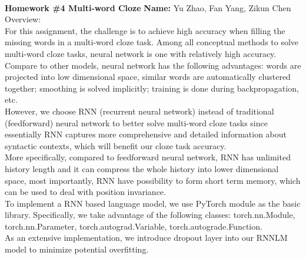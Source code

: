 \documentclass[11pt]{article}
\begin{document}
\\
{{\bf Homework \#4 Multi-word Cloze}} \hfill {{\bf Name:} Yu Zhao, Fan Yang, Zikun Chen} \\

\noindent \Large Overview:\\

\normalsize For this assignment, the challenge is to achieve high accuracy when filling the missing words in a multi-word cloze task. 
Among all conceptual methods to solve multi-word cloze tasks, neural network is one with relatively high accuracy. Compare to other models, neural network has the following advantages: words are projected into low dimensional space, similar words are automatically clustered together; smoothing is solved implicitly; training is done during backpropagation, etc.\\
\indent However, we choose RNN (recurrent neural network) instead of traditional (feedforward) neural network to better solve multi-word cloze tasks since essentially RNN captures more comprehensive and detailed information about syntactic contexts, which will benefit our cloze task accuracy. \\
\indent More specifically, compared to feedforward neural network, RNN has unlimited history length and it can compress the whole history into lower dimensional space, most importantly, RNN have possibility to form short term memory, which can be used to deal with position invariance.\\
\indent To implement a RNN based language model, we use PyTorch module as the basic library. Specifically, we take advantage of the following classes: torch.nn.Module, torch.nn.Parameter, torch.autograd.Variable, torch.autograde.Function.\\
\indent As an extensive implementation, we introduce dropout layer into our RNNLM model to minimize potential overfitting.\\
\end{document}
